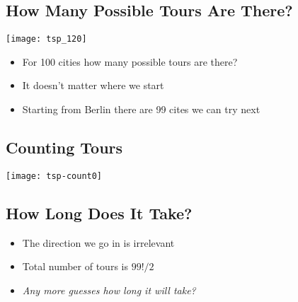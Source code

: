 \begin{slide}
\section{How Many Possible Tours Are There?}

\pausebuild
\begin{minipage}{9cm}
  \begin{center}
    \texttt{[image: tsp\_120]}
  \end{center}
\end{minipage}\hspace{1cm}
\begin{minipage}{12cm}\raggedright
\begin{itemize}
\item For 100 cities how many possible tours are there?\pause
\item It doesn't matter where we start\pause
\item Starting from Berlin there are 99 cites we can try next\pause
\end{itemize}
\end{minipage}

\end{slide}



\begin{slide}
\section[-2]{Counting Tours}
\pb
\pause
\begin{center}
  \texttt{[image: tsp-count0]}
\end{center}

\end{slide}



\begin{slide}
\section{How Long Does It Take?}

\begin{itemize}
\item The direction we go in is irrelevant\pause
\item Total number of tours is $99!/2$\pause
\item \emph{Any more guesses how long it will take?}\pause
\end{itemize}

\end{slide}

